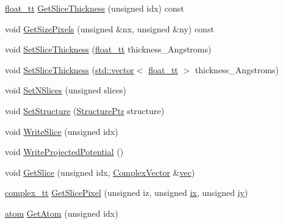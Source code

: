 \begin{DoxyCompactItemize}
\item 
\hyperlink{namespace_q_s_t_e_m_a915d7caa497280d9f927c4ce8d330e47}{float\-\_\-tt} \hyperlink{class_q_s_t_e_m_1_1_c_potential_a3bc49621bc0474ad98685074540dff78}{Get\-Slice\-Thickness} (unsigned idx) const 
\item 
void \hyperlink{class_q_s_t_e_m_1_1_c_potential_a07a83b138be2d802fe9384856640f0a9}{Get\-Size\-Pixels} (unsigned \&nx, unsigned \&ny) const 
\item 
void \hyperlink{class_q_s_t_e_m_1_1_c_potential_aa5f38bb6eb42d0c08aaed1f50b74f34a}{Set\-Slice\-Thickness} (\hyperlink{namespace_q_s_t_e_m_a915d7caa497280d9f927c4ce8d330e47}{float\-\_\-tt} thickness\-\_\-\-Angstroms)
\item 
void \hyperlink{class_q_s_t_e_m_1_1_c_potential_af8c110606944b0129ce26aa8bad0305a}{Set\-Slice\-Thickness} (\hyperlink{qmb_8m_af54b69a32590de218622e869b06b47b3}{std\-::vector}$<$ \hyperlink{namespace_q_s_t_e_m_a915d7caa497280d9f927c4ce8d330e47}{float\-\_\-tt} $>$ thickness\-\_\-\-Angstroms)
\item 
void \hyperlink{class_q_s_t_e_m_1_1_c_potential_af4d42d60b807e7be0af37e33fe9ae00d}{Set\-N\-Slices} (unsigned slices)
\item 
void \hyperlink{class_q_s_t_e_m_1_1_c_potential_abb51a726a0532c22c1daf5f440cefe87}{Set\-Structure} (\hyperlink{namespace_q_s_t_e_m_a7ab0b6bb11e12c9829540e6d872946fc}{Structure\-Ptr} structure)
\item 
void \hyperlink{class_q_s_t_e_m_1_1_c_potential_a41295f2fd00b4d5f756d700ebef51f52}{Write\-Slice} (unsigned idx)
\item 
void \hyperlink{class_q_s_t_e_m_1_1_c_potential_af83e1d0103b17339f46768c9e05615e8}{Write\-Projected\-Potential} ()
\item 
void \hyperlink{class_q_s_t_e_m_1_1_c_potential_a0ab67c8c945cdd2aa25ad9ec04209e9d}{Get\-Slice} (unsigned idx, \hyperlink{namespace_q_s_t_e_m_af210a2c1f9afae1deed746dcd9276221}{Complex\-Vector} \&\hyperlink{draw_xtal_8m_afcf0f444b9db8fc728edff0315b3ab1d}{vec})
\item 
\hyperlink{namespace_q_s_t_e_m_afa320ea3cd2f5ff080c422f81b803a32}{complex\-\_\-tt} \hyperlink{class_q_s_t_e_m_1_1_c_potential_ad9f41c1917e52eb8a7f0061512403f1a}{Get\-Slice\-Pixel} (unsigned iz, unsigned \hyperlink{_display_model_properties_8m_a76b405b72b88bde9488209ac06ddb714}{ix}, unsigned \hyperlink{_display_model_properties_8m_af4c5cec9fce175f73b7da5ecd33c2af6}{iy})
\item 
\hyperlink{namespace_q_s_t_e_m_a402dabc31a7a1fe906d0cdd138c69686}{atom} \hyperlink{class_q_s_t_e_m_1_1_c_potential_a94439ebe2ccd3a0b8cb9bfe5591666ae}{Get\-Atom} (unsigned idx)
\end{DoxyCompactItemize}
